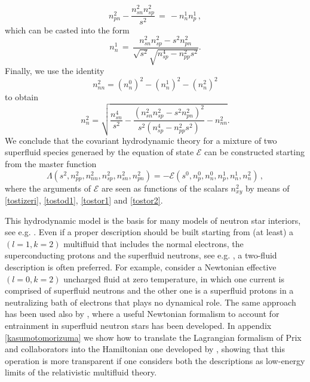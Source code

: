 \documentclass[usenatbib]{mnras}
\begin{document}
%
\begin{equation}
n_{pn}^2 -\dfrac{n_{sn}^2 n_{sp}^2}{s^2} \, = \, - n_n^1 n_p^1 \, ,
\end{equation}
%
which can be casted into the form
%
\begin{equation}\label{tostor1}
n_n^1 \, = \,  \dfrac{n_{sn}^2 n_{sp}^2 - s^2 n_{pn}^2}{\sqrt{s^2} \sqrt{n_{sp}^4 -n_{pp}^2 s^2}}.
\end{equation}
%
Finally, we use the identity
%
\begin{equation}
n_{nn}^2 = (n_n^0)^2 - (n_n^1)^2 - (n_n^2)^2 
\end{equation}
%
to obtain
%
\begin{equation}\label{tostor2}
n_n^2 = \sqrt{ \dfrac{n_{sn}^4}{s^2} - \dfrac{(n_{sn}^2 n_{sp}^2 - s^2 n_{pn}^2)^2}{s^2 (n_{sp}^4 -n_{pp}^2 s^2)} -n_{nn}^2    }.
\end{equation}
%
We conclude that the covariant hydrodynamic theory for a mixture of two superfluid species generaed by the equation of state $\mathcal{E}$ can be constructed starting from the master function
%
\begin{equation}
\Lambda (s^2,n_{pp}^2,n_{nn}^2,n_{sp}^2,n_{sn}^2,n_{pn}^2) 
= 
- \mathcal{E}(s^0,n_p^0,n_n^0, n_p^1,n_n^1,n_n^2) \, ,
\end{equation}
%
where the arguments of $\mathcal{E}$ are seen as functions of the scalars $n_{xy}^2$ by means of \eqref{tostizeri}, \eqref{tostod1}, \eqref{tostor1} and \eqref{tostor2}.

This hydrodynamic model is the basis  for many models of  neutron star interiors, see  e.g. \cite{Comer_Langlois1999}. Even if a proper description should be built starting from (at least)  a $(l=1,k=2)$ multifluid that includes the normal electrons, the superconducting protons and the superfluid neutrons, see e.g. \cite{Gusakov2016}, a two-fluid description is often preferred. For example, \cite{KP2017} consider a Newtonian effective $(l=0,k=2)$ uncharged fluid at zero temperature,  in which one current is comprised of superfluid neutrons and the other one is a superfluid  protons in a neutralizing bath of electrons that plays no dynamical role.
The same approach has been used also by \cite{pca2002}, where a useful Newtonian formalism to account for entrainment in superfluid neutron stars has been developed.
In appendix \ref{kasumotomorizuma} we show how to translate the Lagrangian formalism of Prix and collaborators into the Hamiltonian one developed by \cite{KP2017}, showing that this  operation is more transparent if one considers both the descriptions as low-energy limits of the relativistic multifluid theory.
\end{document}
